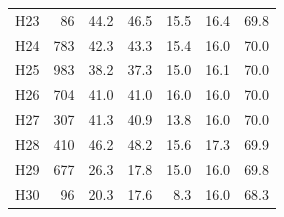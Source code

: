 \documentclass[preprint,12pt]{elsarticle}
\begin{document}
\begin{table}[htbp]
\begin{tabular}{lrrrrrr}
    H23 &    86 & 44.2 & 46.5 & 15.5 & 16.4 & 69.8 \\
    H24 &   783 & 42.3 & 43.3 & 15.4 & 16.0 & 70.0 \\
    H25 &   983 & 38.2 & 37.3 & 15.0 & 16.1 & 70.0 \\
    H26 &   704 & 41.0 & 41.0 & 16.0 & 16.0 & 70.0 \\
    H27 &   307 & 41.3 & 40.9 & 13.8 & 16.0 & 70.0 \\
    H28 &   410 & 46.2 & 48.2 & 15.6 & 17.3 & 69.9 \\
    H29 &   677 & 26.3 & 17.8 & 15.0 & 16.0 & 69.8 \\
    H30 &    96 & 20.3 & 17.6 &  8.3 & 16.0 & 68.3 \\
    \bottomrule
  \end{tabular}
\end{table}
\end{document}
